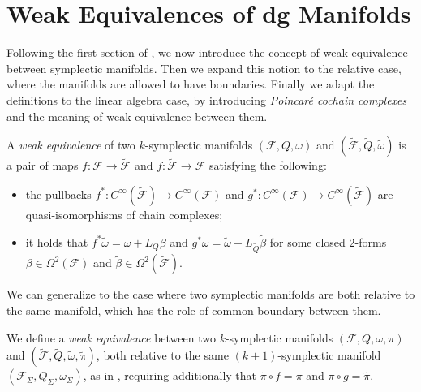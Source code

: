 \section{Weak Equivalences of dg Manifolds}
\label{sec:weak_equiv}

Following the first section of \cite{Gluing_BV-BFV}, we now introduce the concept of weak equivalence between symplectic manifolds.
Then we expand this notion to the relative case, where the manifolds are allowed to have boundaries.
Finally we adapt the definitions to the linear algebra case, by introducing \emph{Poincaré cochain complexes} and the meaning of weak equivalence between them.

\begin{definition}
\label{def:weak_1}
    A \emph{weak equivalence} of two $k$-symplectic manifolds $(\mathcal{F}, Q, \omega)$ and $(\widetilde{\mathcal{F}}, \widetilde{Q}, \widetilde{\omega})$ is a pair of maps $f:\mathcal{F} \rightarrow \widetilde{\mathcal{F}}$ and $f:\widetilde{\mathcal{F}} \rightarrow \mathcal{F}$ satisfying the following:
    \begin{itemize}
        \item the pullbacks $f^*:C^\infty(\widetilde{\mathcal{F}}) \rightarrow C^\infty(\mathcal{F})$ and $g^*:C^\infty(\mathcal{F}) \rightarrow C^\infty(\widetilde{\mathcal{F}})$ are quasi-isomorphisms of chain complexes;
        \item it holds that $f^* \widetilde{\omega} = \omega + L_Q \beta$ and $g^* \omega = \widetilde{\omega} + L_{\widetilde{Q}} \widetilde{\beta}$ for some closed $2$-forms $\beta \in \Omega^2 (\mathcal{F})$ and $\widetilde{\beta} \in \Omega^2 (\widetilde{\mathcal{F}})$.
    \end{itemize}
\end{definition}


We can generalize  to the case where two symplectic manifolds are both relative to the same manifold, which has the role of common boundary between them.

\begin{definition}
\label{def:weak_relative}
    We define a \emph{weak equivalence} between two $k$-symplectic manifolds $(\mathcal{F}, Q, \omega, \pi)$ and $(\widetilde{\mathcal{F}}, \widetilde{Q}, \widetilde{\omega}, \widetilde{\pi})$, both relative to the same $(k+1)$-symplectic manifold $(\mathcal{F}_\Sigma, Q_\Sigma, \omega_\Sigma)$, as in , requiring additionally that $\widetilde{\pi} \circ f = \pi$ and $\pi \circ g = \widetilde{\pi}$.
\end{definition}

